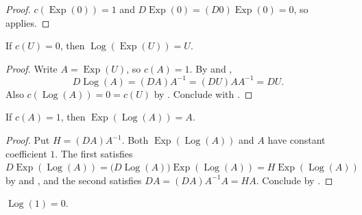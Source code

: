 \begin{proof}
  \leanok
  $c(\operatorname{Exp}(0))=1$ and
  $D\operatorname{Exp}(0)=(D0)\operatorname{Exp}(0)=0$, so
   applies.
\end{proof}

\begin{proposition}
  \label{prop:weil-log-exp}
  \leanok

  If $c(U)=0$, then $\operatorname{Log}(\operatorname{Exp}(U))=U$.
\end{proposition}

\begin{proof}
  \leanok
  Write $A=\operatorname{Exp}(U)$, so $c(A)=1$.  By
   and ,
  \[
    D\operatorname{Log}(A)=(DA)A^{-1}=(DU)AA^{-1}=DU .
  \]
  Also $c(\operatorname{Log}(A))=0=c(U)$ by
  \texttt{}.  Conclude with
  \texttt{}.
\end{proof}

\begin{proposition}
  \label{prop:weil-exp-log}
  \leanok

  If $c(A)=1$, then $\operatorname{Exp}(\operatorname{Log}(A))=A$.
\end{proposition}

\begin{proof}
  \leanok
  Put $H=(DA)A^{-1}$.  Both $\operatorname{Exp}(\operatorname{Log}(A))$ and
  $A$ have constant coefficient $1$.  The first satisfies
  $D\operatorname{Exp}(\operatorname{Log}(A))
   =\bigl(D\operatorname{Log}(A)\bigr)\operatorname{Exp}(\operatorname{Log}(A))
   =H\operatorname{Exp}(\operatorname{Log}(A))$ by
   and , and
  the second satisfies $DA=(DA)A^{-1}A=HA$.  Conclude by
  .
\end{proof}

\begin{lemma}
  \label{lemma:weil-log-one}
  \leanok

  $\operatorname{Log}(1)=0$.
\end{lemma}

